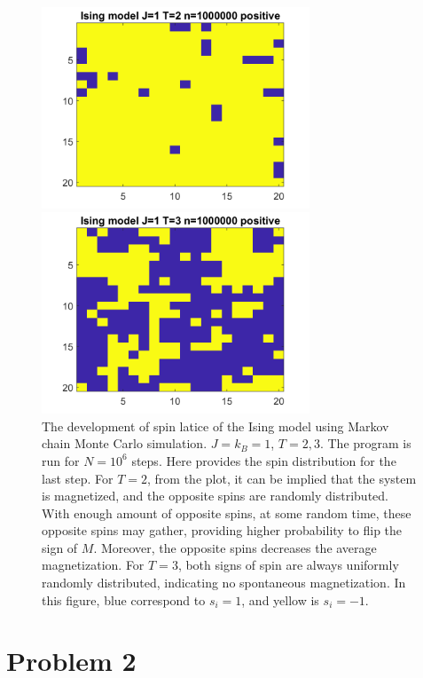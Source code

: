 \documentclass[12pt, graphicx]{article}
\begin{document}
\begin{figure}[ht]
\centering
\begin{minipage}{0.48\linewidth}
\centering
\includegraphics[width = 80mm]{st2n6.png}
\end{minipage}
\begin{minipage}{0.48\linewidth}
\centering
\includegraphics[width = 80mm]{st3n6.png}
\end{minipage}
\caption{The development of spin latice of the Ising model using Markov chain Monte Carlo simulation. $J=k_B=1$, $T=2, 3$. The program is run for $N=10^6$ steps. Here provides the spin distribution for the last step. For $T=2$, from the plot, it can be implied that the system is magnetized, and the opposite spins are randomly distributed. With enough amount of opposite spins, at some random time, these opposite spins may gather, providing higher probability to flip the sign of $M$. Moreover, the opposite spins decreases the average magnetization. For $T=3$, both signs of spin are always uniformly randomly distributed, indicating no spontaneous magnetization. In this figure, blue correspond to $s_i=1$, and yellow is $s_i=-1$.}
\label{fig:st23}
\end{figure}

\clearpage

\section*{Problem 2}
\end{document}
